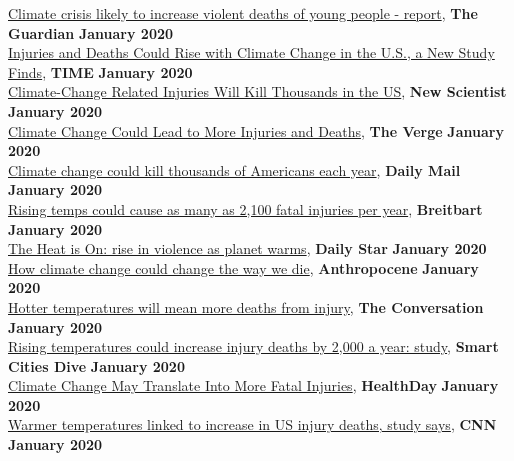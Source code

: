 \href{https://www.theguardian.com/environment/2020/jan/13/climate-crisis-likely-to-increase-violent-deaths-of-young-people-report}{Climate crisis likely to increase violent deaths of young people - report}, \textbf{The Guardian} \hfill \textbf{January 2020} \\
\href{https://time.com/5764673/injuries-deaths-climate-change/}{Injuries and Deaths Could Rise with Climate Change in the U.S., a New Study Finds}, \textbf{TIME} \hfill \textbf{January 2020} \\
\href{https://www.newscientist.com/article/2229627-climate-change-related-injuries-will-kill-thousands-in-the-us/}{Climate-Change Related Injuries Will Kill Thousands in the US}, \textbf{New Scientist} \hfill \textbf{January 2020} \\
\href{https://www.theverge.com/2020/1/13/21063690/climate-change-injuries-deaths-weather-violence-drowning-accidents}{Climate Change Could Lead to More Injuries and Deaths}, \textbf{The Verge} \hfill \textbf{January 2020} \\
\href{https://www.dailymail.co.uk/health/article-7882007/Global-temperatures-rising-just-3-degrees-lead-2-100-Americans-dying-year.html}{Climate change could kill thousands of Americans each year}, \textbf{Daily Mail} \hfill \textbf{January 2020} \\
\href{https://www.breitbart.com/news/rising-temps-could-cause-as-many-as-2100-fatal-injuries-per-year/}{Rising temps could cause as many as 2,100 fatal injuries per year}, \textbf{Breitbart} \hfill \textbf{January 2020} \\
\href{}{The Heat is On: rise in violence as planet warms}, \textbf{Daily Star} \hfill \textbf{January 2020} \\
\href{http://www.anthropocenemagazine.org/2020/01/how-climate-change-could-change-way-we-die/}{How climate change could change the way we die}, \textbf{Anthropocene} \hfill \textbf{January 2020} \\
\href{https://theconversation.com/car-accidents-drownings-violence-hotter-temperatures-will-mean-more-deaths-from-injury-129628}{Hotter temperatures will mean more deaths from injury}, \textbf{The Conversation} \hfill \textbf{January 2020} \\
\href{https://www.smartcitiesdive.com/news/rising-temperatures-could-increase-injury-deaths-by-2000-a-year-study/570457/}{Rising temperatures could increase injury deaths by 2,000 a year: study}, \textbf{Smart Cities Dive} \hfill \textbf{January 2020} \\
\href{https://consumer.healthday.com/diseases-and-conditions-information-37/heat-and-sunstroke-health-news-370/climate-change-may-translate-into-more-fatal-injuries-753852.html}{Climate Change May Translate Into More Fatal Injuries}, \textbf{HealthDay} \hfill \textbf{January 2020} \\
\href{https://www.cnn.com/2020/01/13/health/warm-temperatures-injury-deaths-study/index.html}{Warmer temperatures linked to increase in US injury deaths, study says}, \textbf{CNN} \hfill \textbf{January 2020}

